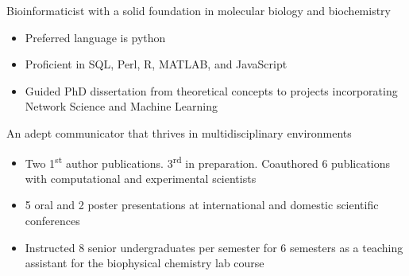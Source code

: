

\begin{cventries}
\vspace{-4.0mm}

  \cventry
    {} %
    {} %
    {} %
    {} %
    {
      \begin{cvitems} %
      	\item {Bioinformaticist with a solid foundation in molecular biology and biochemistry}
      		\begin{itemize}
      			\item Preferred language is python
      			\item Proficient in SQL, Perl, R, MATLAB, and JavaScript
      			\item Guided PhD dissertation from theoretical concepts to projects incorporating Network Science and Machine Learning
      		\end{itemize}	
\vspace{1.0mm}
        \item {An adept communicator that thrives in multidisciplinary environments}
        	\begin{itemize}
         		\item Two 1\textsuperscript{st} author publications. 3\textsuperscript{rd} in preparation. Coauthored 6 publications with computational and experimental scientists
         		\item 5 oral and 2 poster presentations at international and domestic scientific conferences
         		\item Instructed 8 senior undergraduates per semester for 6 semesters as a teaching assistant for the biophysical chemistry lab course
        	\end{itemize}
      \end{cvitems}
    }
\vspace{-4.0mm}
\end{cventries}
